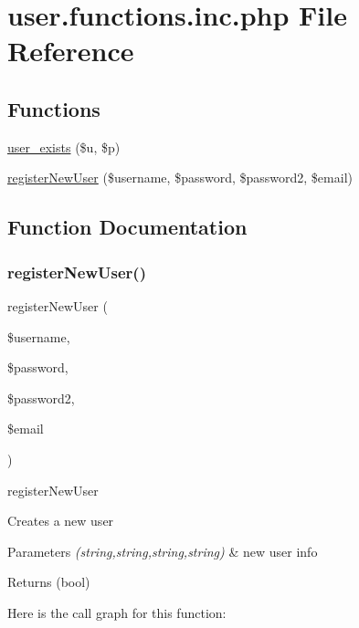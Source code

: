 \hypertarget{user_8functions_8inc_8php}{}\section{user.\+functions.\+inc.\+php File Reference}
\label{user_8functions_8inc_8php}
\subsection*{Functions}
\begin{DoxyCompactItemize}
\item 
\hyperlink{user_8functions_8inc_8php_a9ae9cc2685b235f6ecc9fd31d3cff348}{user\+\_\+exists} (\$u, \$p)
\item 
\hyperlink{user_8functions_8inc_8php_a3984e5c469d3513e811485c9ff0156ea}{register\+New\+User} (\$username, \$password, \$password2, \$email)
\end{DoxyCompactItemize}


\subsection{Function Documentation}
\mbox{\label{user_8functions_8inc_8php_a3984e5c469d3513e811485c9ff0156ea}} 
\subsubsection{\texorpdfstring{register\+New\+User()}{registerNewUser()}}
{\footnotesize\ttfamily register\+New\+User (\begin{DoxyParamCaption}\item[{}]{\$username,  }\item[{}]{\$password,  }\item[{}]{\$password2,  }\item[{}]{\$email }\end{DoxyParamCaption})}

register\+New\+User

Creates a new user 
\begin{DoxyParams}{Parameters}
{\em (string,string,string,string)} & new user info \\
\hline
\end{DoxyParams}
\begin{DoxyReturn}{Returns}
(bool) 
\end{DoxyReturn}
Here is the call graph for this function\+:
\mbox{\label{user_8functions_8inc_8php_a9ae9cc2685b235f6ecc9fd31d3cff348}} 
